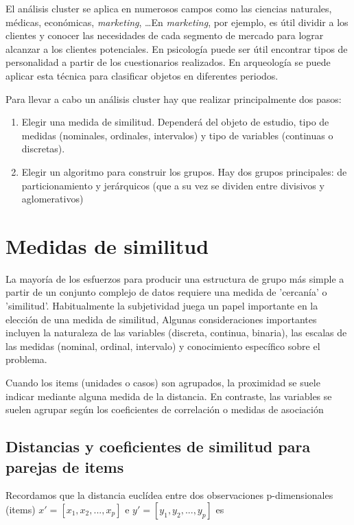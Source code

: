 \documentclass[a4paper, 20pt]{article}
\begin{document}
El análisis cluster se aplica en numerosos campos como las ciencias naturales, médicas, económicas, \textit{marketing}, \dots En \textit{marketing}, por ejemplo, es útil dividir a los clientes y conocer las necesidades de cada segmento de mercado para lograr alcanzar a los clientes potenciales. En psicología puede ser útil encontrar tipos de personalidad a partir de los cuestionarios realizados. En arqueología se puede aplicar esta técnica para clasificar objetos en diferentes periodos.

Para llevar a cabo un análisis cluster hay que realizar principalmente dos pasos:

\begin{enumerate}
\item Elegir una medida de similitud. Dependerá del objeto de estudio, tipo de medidas (nominales, ordinales, intervalos) y tipo de variables (continuas o discretas).
\item Elegir un algoritmo para construir los grupos. Hay dos grupos principales: de particionamiento y jerárquicos (que a su vez se dividen entre divisivos y aglomerativos)
\end{enumerate}

\section{Medidas de similitud}\label{sec:medidas de similitud}

La mayoría de los esfuerzos para producir una estructura de grupo más simple a partir de un conjunto complejo de datos requiere una medida de 'cercanía' o  'similitud'. Habitualmente la subjetividad juega un papel importante en la elección de una medida de similitud, Algunas consideraciones importantes incluyen la naturaleza de las variables (discreta, continua, binaria), las escalas de las medidas (nominal, ordinal, intervalo) y conocimiento específico sobre el problema.

Cuando los items (unidades o casos) son agrupados, la proximidad se suele indicar mediante alguna medida de la distancia. En contraste, las variables se suelen agrupar según los coeficientes de correlación o medidas de asociación

\subsection{Distancias y coeficientes de similitud para parejas de items}

Recordamos que la distancia euclídea entre dos observaciones p-dimensionales (items) $x' = [x_1,x_2,...,x_p]$ e $y'=[y_1,y_2,...,y_p]$ es
\end{document}
